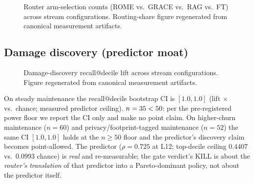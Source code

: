 \documentclass[preprint,12pt]{elsarticle}
\begin{document}
\begin{figure}[t]
\centering

\caption{Router arm-selection counts (ROME vs.\ GRACE vs.\ RAG vs.\ FT) across stream configurations.
Routing-share figure regenerated from canonical measurement artifacts.}
\label{fig:router}
\end{figure}

\subsection{Damage discovery (predictor moat)}
\begin{figure}[t]
\centering

\caption{Damage-discovery recall@decile lift across stream configurations. Figure regenerated from canonical measurement artifacts.}
\label{fig:discovery}
\end{figure}
On steady maintenance the recall@decile bootstrap CI is $[1.0, 1.0]$ (lift \discLift$\times$
vs.\ chance; \discCeil{} measured predictor ceiling). $n = 35 < 50$: per the
pre-registered power floor we report the CI only and make no point claim. On
higher-churn maintenance ($n{=}60$) and privacy/footprint-tagged maintenance ($n{=}52$) the same CI $[1.0, 1.0]$ holds at the
$n \ge 50$ floor and the predictor's discovery claim becomes point-allowed. The
predictor ($\rho = 0.725$ at L12; top-decile ceiling 0.4407 vs.\ 0.0993 chance) is
\emph{real} and re-measurable; the gate verdict's KILL is about the
\emph{router's translation} of that predictor into a Pareto-dominant policy, not
about the predictor itself.
\end{document}
